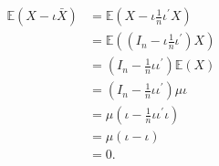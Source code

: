 \documentclass{tstextbook}
\begin{document}
\begin{example}
	\label{example1.3}

\begin{align*}
\mathbb{E}(X-\iota\bar{X}) & =\mathbb{E}\left(X-\iota\frac{1}{n}\iota^{\prime}X\right)\\
 & =\mathbb{E}\left(\left(I_{n}-\iota\frac{1}{n}\iota^{\prime}\right)X\right)\\
 & =\left(I_{n}-\frac{1}{n}\iota\iota^{\prime}\right)\mathbb{E}(X)\\
 & =\left(I_{n}-\frac{1}{n}\iota\iota^{\prime}\right)\mu\iota\\
 & =\mu\left(\iota-\frac{1}{n}\iota\iota^{\prime}\iota\right)\\
 & =\mu(\iota-\iota)\\
 & =0.
\end{align*}

\end{example}
\end{document}
